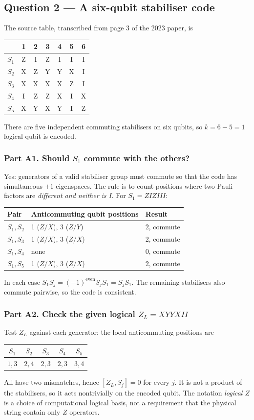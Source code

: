 \subsection{Question 2 --- A six-qubit stabiliser code}
The source table, transcribed from page 3 of the 2023 paper, is
\begin{center}\small
\begin{tabular}{@{}c*{6}{c}@{}}\toprule
&1&2&3&4&5&6\\\midrule
$S_1$&Z&I&Z&I&I&I\\
$S_2$&X&Z&Y&Y&X&I\\
$S_3$&X&X&X&X&Z&I\\
$S_4$&I&Z&Z&X&I&X\\
$S_5$&X&Y&X&Y&I&Z\\\bottomrule
\end{tabular}\end{center}
There are five independent commuting stabilisers on six qubits, so $k=6-5=1$ logical qubit is encoded.

\subsubsection*{Part A1. Should $S_1$ commute with the others?}
Yes: generators of a valid stabiliser group must commute so that the code has simultaneous $+1$ eigenspaces. The rule is to count positions where two Pauli factors are \emph{different and neither is $I$}. For $S_1=ZIZIII$:
\begin{center}\small
\begin{tabular}{@{}lll@{}}\toprule Pair & Anticommuting qubit positions & Result\\\midrule
$S_1,S_2$ & 1 ($Z/X$), 3 ($Z/Y$) & 2, commute\\
$S_1,S_3$ & 1 ($Z/X$), 3 ($Z/X$) & 2, commute\\
$S_1,S_4$ & none & 0, commute\\
$S_1,S_5$ & 1 ($Z/X$), 3 ($Z/X$) & 2, commute\\\bottomrule
\end{tabular}\end{center}
In each case $S_1S_j=(-1)^{\text{even}}S_jS_1=S_jS_1$. The remaining stabilisers also commute pairwise, so the code is consistent.

\subsubsection*{Part A2. Check the given logical $Z_L=XYYXII$}
Test $Z_L$ against each generator: the local anticommuting positions are
\begin{center}\small
\begin{tabular}{@{}ccccc@{}}\toprule
$S_1$&$S_2$&$S_3$&$S_4$&$S_5$\\\midrule
$1,3$&$2,4$&$2,3$&$2,3$&$3,4$\\\bottomrule
\end{tabular}\end{center}
All have two mismatches, hence $[Z_L,S_j]=0$ for every $j$. It is not a product of the stabilisers, so it acts nontrivially on the encoded qubit. The notation \emph{logical $Z$} is a choice of computational logical basis, not a requirement that the physical string contain only $Z$ operators.

